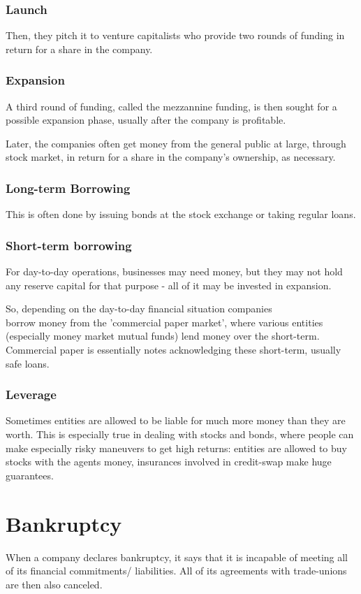 \documentclass[oneside, article]{memoir}
\begin{document}
\subsubsection{Launch}
Then, they pitch it to venture capitalists who provide two rounds of funding in return for a share in the company.

\subsubsection{Expansion}
A third round of funding, called the mezzannine funding, is then sought for a possible expansion phase, usually after the company is profitable.

Later, the companies often get money from the general public at large, through stock market, in return for a share in the company's ownership, as necessary.

\subsubsection{Long-term Borrowing}
This is often done by issuing bonds at the stock exchange or taking regular loans.

\subsubsection{Short-term borrowing}
For day-to-day operations, businesses may need money, but they may not hold any reserve capital for that purpose - all of it may be invested in expansion.

So, depending on the day-to-day financial situation companies \\borrow money from the 'commercial paper market', where various entities (especially money market mutual funds) lend money over the short-term. Commercial paper is essentially notes acknowledging these short-term, usually safe loans.

\subsubsection{Leverage}
Sometimes entities are allowed to be liable for much more money than they are worth. This is especially true in dealing with stocks and bonds, where people can make especially risky maneuvers to get high returns: entities are allowed to buy stocks with the agents money, insurances involved in credit-swap make huge guarantees.

\section{Bankruptcy}
When a company declares bankruptcy, it says that it is incapable of meeting all of its financial commitments/ liabilities. All of its agreements with trade-unions are then also canceled.
\end{document}
